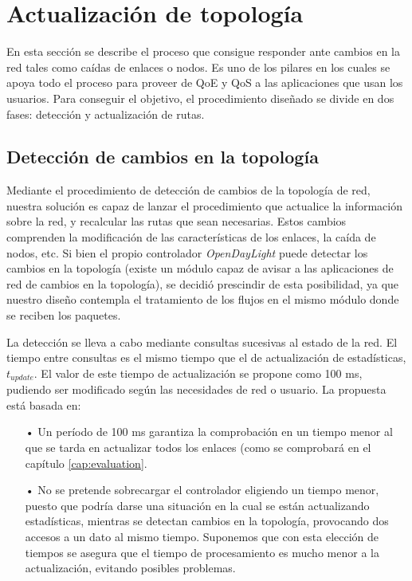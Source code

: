 \documentclass[a4paper,11pt]{book}
\begin{document}
\section{Actualización de topología}
\label{updateTopology}

En esta sección se describe el proceso que consigue responder ante cambios en la red tales como caídas de enlaces o nodos. Es uno de los pilares en los cuales se apoya todo el proceso para proveer de \ac{QoE} y \ac{QoS} a las aplicaciones que usan los usuarios. Para conseguir el objetivo, el procedimiento diseñado se divide en dos fases: detección y actualización de rutas.

\subsection{Detección de cambios en la topología}

Mediante el procedimiento de detección de cambios de la topología de red, nuestra solución es capaz de lanzar el procedimiento que actualice la información sobre la red, y recalcular las rutas que sean necesarias. Estos cambios comprenden la modificación de las características de los enlaces, la caída de nodos, etc. Si bien el propio controlador \emph{OpenDayLight} puede detectar los cambios en la topología (existe un módulo capaz de avisar a las aplicaciones de red de cambios en la topología), se decidió prescindir de esta posibilidad, ya que nuestro diseño contempla el tratamiento de los flujos en el mismo módulo donde se reciben los paquetes.

La detección se lleva a cabo mediante consultas sucesivas al estado de la red. El tiempo entre consultas es el mismo tiempo que el de actualización de estadísticas, $t_{update}$. El valor de este tiempo de actualización se propone como 100 ms, pudiendo ser modificado según las necesidades de red o usuario. La propuesta está basada en:

\begin{itemize}
\item [•] Un período de 100 ms garantiza la comprobación en un tiempo menor al que se tarda en actualizar todos los enlaces (como se comprobará en el capítulo \ref{cap:evaluation}.
\item [•] No se pretende sobrecargar el controlador eligiendo un tiempo menor, puesto que podría darse una situación en la cual se están actualizando estadísticas, mientras se detectan cambios en la topología, provocando dos accesos a un dato al mismo tiempo. Suponemos que con esta elección de tiempos se asegura que el tiempo de procesamiento es mucho menor a la actualización, evitando posibles problemas.
\end{itemize}
\end{document}
